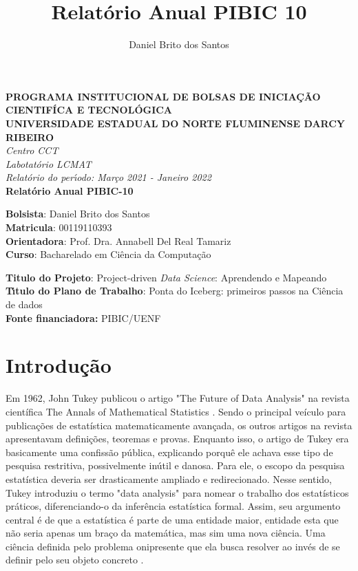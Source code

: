 \documentclass{article}
\title{Relatório Anual PIBIC 10}
\author{Daniel Brito dos Santos}
\begin{document}
\begin{titlepage}
\begin{center}
\large
\textbf{PROGRAMA INSTITUCIONAL DE BOLSAS DE INICIA\c{C}\~{A}O CIENTIF\'{I}CA E TECNOL\'{O}GICA\\\vspace{0,5cm}
UNIVERSIDADE ESTADUAL DO NORTE FLUMINENSE DARCY RIBEIRO\\
}
\textit{Centro CCT \\
Labotat\'{o}rio LCMAT\\
\vspace{1cm}
Relat\'{o}rio do per\'{\i}odo: Março 2021 - Janeiro 2022}\\
\vspace{1,5cm}
\textbf{Relat\'{o}rio Anual PIBIC-10}\\\vspace{5cm}
\end{center}
\textbf{Bolsista}: Daniel Brito dos Santos\\
\textbf{Matricula}: 00119110393\\
\textbf{Orientadora}: Prof. Dra. Annabell Del Real Tamariz  \\
\textbf{Curso}: Bacharelado em Ci\^{e}ncia da Computa\c{c}\~{a}o\\
\vspace{3cm}
\begin{center}
\textbf{Titulo do Projeto}: Project-driven \textit{Data Science}: Aprendendo e Mapeando\\
\textbf{T\'{\i}tulo do Plano de Trabalho}: Ponta do Iceberg: primeiros passos na Ciência de dados\\
\textbf{Fonte financiadora:} PIBIC/UENF
\end{center}
\end{titlepage}



\section{Introdução}
Em 1962, John Tukey publicou o artigo "The Future of Data Analysis" na revista científica The Annals of Mathematical Statistics \cite{FoDA}. Sendo o principal veículo para publicações de estatística matematicamente avançada, os outros artigos na revista apresentavam definições, teoremas e provas. Enquanto isso, o artigo de Tukey era basicamente uma confissão pública, explicando porquê ele achava esse tipo de pesquisa restritiva, possivelmente inútil e danosa. \cite{DONOHO}
Para ele, o escopo da pesquisa estatística deveria ser drasticamente ampliado e redirecionado. Nesse sentido, Tukey introduziu o termo "data analysis" para nomear o trabalho dos estatísticos práticos, diferenciando-o da inferência estatística formal. 
Assim, seu argumento central é de que a estatística é parte de uma entidade maior, entidade esta que não seria apenas um braço da matemática, mas sim uma nova ciência. Uma ciência definida pelo problema onipresente que ela busca resolver ao invés de se definir pelo seu objeto concreto \cite{DONOHO}.
\end{document}
